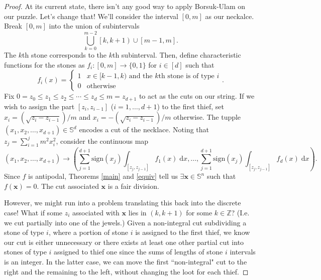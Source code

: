 \documentclass[12pt]{amsart}
\theoremstyle{definition}
\begin{document}
    \begin{proof}
        At its current state, there isn't any good way to apply Borsuk-Ulam on our puzzle. Let's change that! We'll consider the interval $[0,m]$ as our neckalce. Break $[0,m]$ into the union of subintervals $$\bigcup_{k=0}^{m-2} \left[k, k+1\right) \cup \left[m-1, m\right].$$ The $k$th stone corresponds to the $k$th subinterval. Then, define characteristic functions for the stones as $f_i:[0,m] \to \{0,1\}$ for $i \in [d]$ such that $$f_i(x) = \begin{cases} 1 & x \in [k-1, k) \text{ and the $k$th stone is of type $i$}\\ 0 & \text{otherwise} \end{cases}.$$ Fix $0 = z_0 \leq z_1 \leq z_2 \leq \cdots \leq z_d \leq m= z_{d+1}$ to act as the cuts on our string. If we wish to assign the part $[z_i,z_{i-1}]$ ($i = 1, \ldots, d+1$) to the first thief, set $x_i = \left(\sqrt{z_{i} - z_{i-1}}\right)/m$ and $x_i = -\left(\sqrt{z_i - z_{i-1}}\right)/m$ otherwise. The tupple $(x_1,x_2,\ldots,x_{d+1}) \in \mathbb S^d$ encodes a cut of the necklace. Noting that $z_j = \sum_{i=1}^{j} m^2x_i^2$, consider the continuous map $$(x_1,x_2,\ldots,x_{d+1}) \to \left(\sum_{j=1}^{d+1} \mathrm{sign}(x_j) \int_{[z_j,z_{j-1}]} f_1(x) \; \mathrm{d}x , \ldots, \sum_{j=1}^{d+1} \mathrm{sign}(x_j) \int_{[z_j,z_{j-1}]} f_d(x) \; \mathrm{d}x\right).$$ Since $f$ is antipodal, Theorems \ref{main} and \ref{equiv} tell us $\exists \mathbf x \in \mathbb S^n$ such that $f(\mathbf x) = 0$. The cut associated $\mathbf x$ is a fair division. 

        However, we might run into a problem translating this back into the discrete case! What if some $z_i$ associated with $\mathbf x$ lies in $\left(k, k+1\right)$ for some $k \in \mathbb Z$? (I.e. we cut partially into one of the jewels.) Given a non-integral cut subdividing a stone of type $i$, where a portion of stone $i$ is assigned to the first thief, we know our cut is either unnecessary or there exists at least one other partial cut into stones of type $i$ assigned to thief one since the sums of lengths of stone $i$ intervals is an integer. In the latter case, we can move the first ``non-integral" cut to the right and the remaining to the left, without changing the loot for each thief.
    \end{proof}
    
    
    
    
\end{document}
